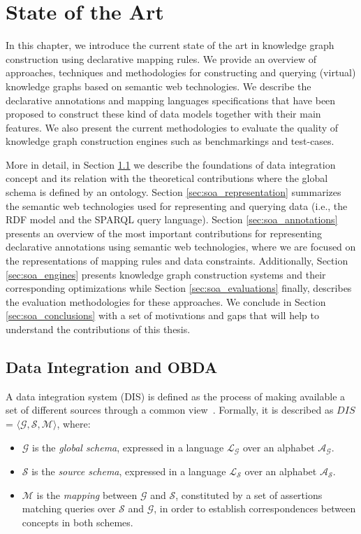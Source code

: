 \chapter{State of the Art}
\label{chap:soa}

In this chapter, we introduce the current state of the art in knowledge graph construction using declarative mapping rules. We provide an overview of approaches, techniques and methodologies for constructing and querying (virtual) knowledge graphs based on semantic web technologies. We describe the declarative annotations and mapping languages specifications that have been proposed to construct these kind of data models together with their main features. We also present the current methodologies to evaluate the quality of knowledge graph construction engines such as benchmarkings and test-cases. 

More in detail, in Section \ref{sec:soa_integration} we describe the foundations of data integration concept and its relation with the theoretical contributions where the global schema is defined by an ontology. Section \ref{sec:soa_representation} summarizes the semantic web technologies used for representing and querying data (i.e., the RDF model and the SPARQL query language). Section \ref{sec:soa_annotations} presents an overview of the most important contributions for representing declarative annotations using semantic web technologies, where we are focused on the representations of mapping rules and data constraints. Additionally, Section \ref{sec:soa_engines} presents knowledge graph construction systems and their corresponding optimizations while Section \ref{sec:soa_evaluations} finally, describes the evaluation methodologies for these approaches. We conclude in Section \ref{sec:soa_conclusions} with a set of motivations and gaps that will help to understand the contributions of this thesis.


\section{Data Integration and OBDA}
\label{sec:soa_integration}
A data integration system (DIS) is defined as the process of making available a set of different sources through a common view~\citep{Lenzerini02}. Formally, it is described as $DIS$ = $\langle \mathcal{G}, \mathcal{S}, \mathcal{M} \rangle$, where:
\begin{itemize}
    \item $\mathcal{G}$ is the \textit{global schema}, expressed in a language $\mathcal{L_G}$ over an alphabet $\mathcal{A_G}$.
    
    \item $\mathcal{S}$ is the \textit{source schema}, expressed in a language $\mathcal{L_S}$ over an alphabet $\mathcal{A_S}$.
    
    \item $\mathcal{M}$ is the \textit{mapping} between $\mathcal{G}$ and $\mathcal{S}$, constituted by a set of assertions matching queries over $\mathcal{S}$ and $\mathcal{G}$, in order to establish correspondences between concepts in both schemes.
\end{itemize}


